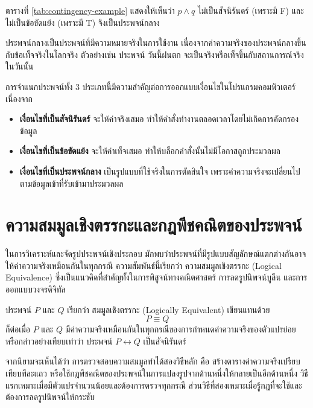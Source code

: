 ตารางที่ \ref{tab:contingency-example} แสดงให้เห็นว่า $p \land q$ ไม่เป็นสัจนิรันดร์ (เพราะมี F) และไม่เป็นข้อขัดแย้ง (เพราะมี T) จึงเป็นประพจน์กลาง

ประพจน์กลางเป็นประพจน์ที่มีความหมายจริงในการใช้งาน เนื่องจากค่าความจริงของประพจน์กลางขึ้นกับข้อเท็จจริงในโลกจริง ตัวอย่างเช่น ประพจน์ วันนี้ฝนตก จะเป็นจริงหรือเท็จขึ้นกับสถานการณ์จริงในวันนั้น

การจำแนกประพจน์ทั้ง 3 ประเภทนี้มีความสำคัญต่อการออกแบบเงื่อนไขในโปรแกรมคอมพิวเตอร์ เนื่องจาก
\begin{itemize}
    \item \textbf{เงื่อนไขที่เป็นสัจนิรันดร์} จะให้ค่าจริงเสมอ ทำให้คำสั่งทำงานตลอดเวลาโดยไม่เกิดการคัดกรองข้อมูล
    \item \textbf{เงื่อนไขที่เป็นข้อขัดแย้ง} จะให้ค่าเท็จเสมอ ทำให้บล็อกคำสั่งนั้นไม่มีโอกาสถูกประมวลผล
    \item \textbf{เงื่อนไขที่เป็นประพจน์กลาง} เป็นรูปแบบที่ใช้จริงในการตัดสินใจ เพราะค่าความจริงจะเปลี่ยนไปตามข้อมูลเข้าที่รับเข้ามาประมวลผล
\end{itemize}

\section{ความสมมูลเชิงตรรกะและกฎพีชคณิตของประพจน์}
\label{sec:equivalence}
\label{sec:logical-equivalence}

ในการวิเคราะห์และจัดรูปประพจน์เชิงประกอบ มักพบว่าประพจน์ที่มีรูปแบบสัญลักษณ์แตกต่างกันอาจให้ค่าความจริงเหมือนกันในทุกกรณี ความสัมพันธ์นี้เรียกว่า ความสมมูลเชิงตรรกะ (Logical Equivalence) ซึ่งเป็นแนวคิดที่สำคัญทั้งในการพิสูจน์ทางคณิตศาสตร์ การลดรูปนิพจน์บูลีน และการออกแบบวงจรดิจิทัล~\parencite{grimaldi2004discrete}

\begin{definition}
ประพจน์ $P$ และ $Q$ เรียกว่า สมมูลเชิงตรรกะ (Logically Equivalent) เขียนแทนด้วย
\[ P \equiv Q \]
ก็ต่อเมื่อ $P$ และ $Q$ มีค่าความจริงเหมือนกันในทุกกรณีของการกำหนดค่าความจริงของตัวแปรย่อย หรือกล่าวอย่างเทียบเท่าว่า ประพจน์ $P \leftrightarrow Q$ เป็นสัจนิรันดร์
\end{definition}

จากนิยามจะเห็นได้ว่า การตรวจสอบความสมมูลทำได้สองวิธีหลัก คือ สร้างตารางค่าความจริงเปรียบเทียบทีละแถว หรือใช้กฎพีชคณิตของประพจน์ในการแปลงรูปจากด้านหนึ่งให้กลายเป็นอีกด้านหนึ่ง วิธีแรกเหมาะเมื่อมีตัวแปรจำนวนน้อยและต้องการตรวจทุกกรณี ส่วนวิธีที่สองเหมาะเมื่อรู้กฎที่จะใช้และต้องการลดรูปนิพจน์ให้กระชับ

